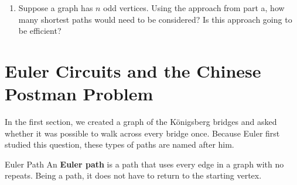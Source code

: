 \begin{enumerate}[start=33]
\begin{enumerate}
\item	Suppose a graph has $n$ odd vertices.  Using the approach from part a, how many shortest paths would need to be considered?  Is this approach going to be efficient?
\end{enumerate}


\end{enumerate}



\ifdefined \old


\section{Euler Circuits and the Chinese Postman Problem}
In the first section, we created a graph of the K\"onigsberg bridges and asked whether it was possible to walk across every bridge once.  Because Euler first studied this question, these types of paths are named after him.


\begin{definition}{Euler Path}{}
An \textbf{Euler path} is a path that uses every edge in a graph with no repeats.  Being a path, it does not have to return to the starting vertex.
\end{definition}

